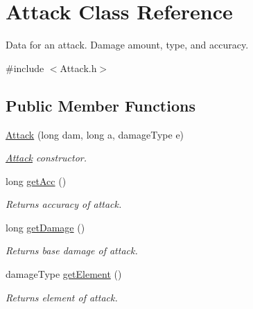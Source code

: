 \hypertarget{class_attack}{}\section{Attack Class Reference}
\label{class_attack}


Data for an attack. Damage amount, type, and accuracy.  




{\ttfamily \#include $<$Attack.\+h$>$}

\subsection*{Public Member Functions}
\begin{DoxyCompactItemize}
\item 
\hyperlink{class_attack_ae96e4933fd3b60a53543491d15f05913}{Attack} (long dam, long a, damage\+Type e)\hypertarget{class_attack_ae96e4933fd3b60a53543491d15f05913}{}\label{class_attack_ae96e4933fd3b60a53543491d15f05913}

\begin{DoxyCompactList}\small\item\em \hyperlink{class_attack}{Attack} constructor. \end{DoxyCompactList}\item 
long \hyperlink{class_attack_a2212805bb57a3da698bf720b213c5304}{get\+Acc} ()\hypertarget{class_attack_a2212805bb57a3da698bf720b213c5304}{}\label{class_attack_a2212805bb57a3da698bf720b213c5304}

\begin{DoxyCompactList}\small\item\em Returns accuracy of attack. \end{DoxyCompactList}\item 
long \hyperlink{class_attack_ad2826485a531b1b885a0ed6618b175da}{get\+Damage} ()\hypertarget{class_attack_ad2826485a531b1b885a0ed6618b175da}{}\label{class_attack_ad2826485a531b1b885a0ed6618b175da}

\begin{DoxyCompactList}\small\item\em Returns base damage of attack. \end{DoxyCompactList}\item 
damage\+Type \hyperlink{class_attack_af9a766300c7ae142bb29bb47f421e281}{get\+Element} ()\hypertarget{class_attack_af9a766300c7ae142bb29bb47f421e281}{}\label{class_attack_af9a766300c7ae142bb29bb47f421e281}

\begin{DoxyCompactList}\small\item\em Returns element of attack. \end{DoxyCompactList}\end{DoxyCompactItemize}
